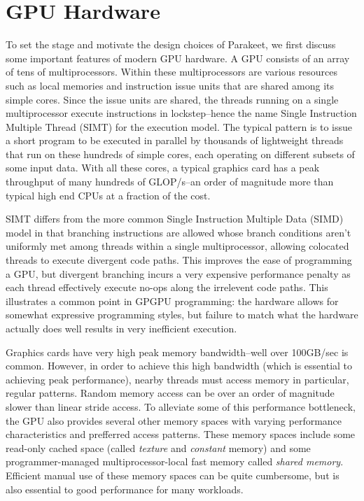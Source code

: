 \documentclass[preprint]{sigplanconf}
\begin{document}
\section{GPU Hardware}
To set the stage and motivate the design choices of Parakeet, we first discuss
some important features of modern GPU hardware.  A GPU consists of an array
of tens of multiprocessors.  Within these multiprocessors are various
resources such as local memories and instruction issue units that are shared
among its simple cores. Since the issue units are shared, the threads running
on a single multiprocessor execute instructions in lockstep--hence the name
Single Instruction Multiple Thread (SIMT) for the execution model.  The typical
pattern is to issue a short program to be executed in parallel by thousands
of lightweight threads that run on these hundreds of simple cores, each
operating on different subsets of some input data.  With all these cores, a
typical graphics card has a peak throughput of many hundreds of GLOP/s--an
order of magnitude more than typical high end CPUs at a fraction of the cost.

SIMT differs from the more common Single Instruction Multiple Data (SIMD) model
in that branching instructions are allowed whose branch conditions aren't
uniformly met among threads within a single multiprocessor, allowing colocated
threads to execute divergent code paths.  This improves the ease of programming
a GPU, but divergent branching incurs a very expensive performance penalty as
each thread effectively execute no-ops along the irrelevent code paths.  This
illustrates a common point in GPGPU programming: the hardware allows for
somewhat expressive programming styles, but failure to match what the hardware
actually does well results in very inefficient execution.

Graphics cards have very high peak memory bandwidth--well over 100GB/sec is
common.  However, in order to achieve this high bandwidth (which is essential
to achieving peak performance), nearby threads must access memory in
particular, regular patterns.  Random memory access can be over an order of
magnitude slower than linear stride access.  To alleviate some of this
performance bottleneck, the GPU also provides several other memory spaces with
varying performance characteristics and prefferred access patterns.  These
memory spaces include some read-only cached space (called \emph{texture} and
\emph{constant} memory) and some programmer-managed multiprocessor-local fast
memory called \emph{shared memory}.  Efficient manual use of these memory spaces
can be quite cumbersome, but is also essential to good performance for many
workloads.
\end{document}
